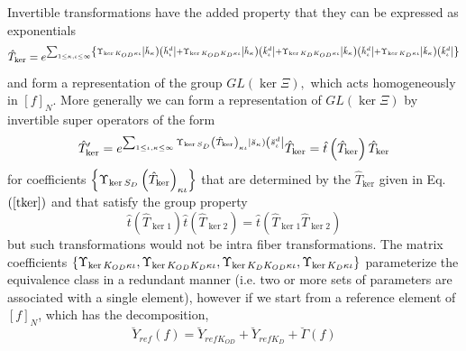 Invertible transformations have the added property that they can be
expressed as exponentials 
\begin{equation}
\hat{T}_{\ker }=e^{\sum_{1\leq \kappa ,\iota \leq \infty }\left\{ {\rm %
\Upsilon }_{\ker K_{OD}\kappa \iota }\left| \breve{h}_{\kappa }\right)
\left( \breve{h}_{\iota }^{d}\right| +{\rm \Upsilon }_{\ker
K_{OD}K_{D}\kappa \iota }\left| \breve{h}_{\kappa }\right) \left( \breve{k}%
_{\iota }^{d}\right| +{\rm \Upsilon }_{\ker K_{D}K_{OD}\kappa \iota }\left| 
\breve{k}_{\kappa }\right) \left( \breve{h}_{\iota }^{d}\right| +{\rm %
\Upsilon }_{\ker K_{D}\kappa \iota }\left| \breve{k}_{\kappa }\right) \left( 
\breve{k}_{\iota }^{d}\right| \right\} }  \label{tker}
\end{equation}%
and form a representation of the group $GL\left( \ker \Xi \right) ,$ which
acts homogeneously\cite{homogen} in $\left[ f\right] _{N}$. More generally
we can form a representation of $GL\left( \ker \Xi \right) $ by invertible
super operators of the form 
\begin{equation}
\hat{T}_{\ker }^{\prime }=e^{\sum_{1\leq \iota ,\kappa \leq \infty }{\rm %
\Upsilon }_{\ker S_{D}}\left( \hat{T}_{\ker }\right) _{\kappa \iota }\left| 
\breve{s}_{\kappa }\right) \left( \breve{s}_{\iota }^{d}\right| }\hat{T}%
_{\ker }=\hat{t}\left( \hat{T}_{\ker }\right) \hat{T}_{\ker }
\end{equation}%
for coefficients $\left\{ {\rm \Upsilon }_{\ker S_{D}}\left( \hat{T}_{\ker
}\right) _{\kappa \iota }\right\} $ that are determined by the $\hat{T}%
_{\ker }$ given in Eq.$\left( \ref{tker}\right) $ and that satisfy the group
property%
\begin{equation}
\hat{t}\left( \hat{T}_{\ker 1}\right) \hat{t}\left( \hat{T}_{\ker 2}\right) =%
\hat{t}\left( \hat{T}_{\ker 1}\hat{T}_{\ker 2}\right)
\end{equation}%
but such transformations would not be intra fiber transformations. The
matrix coefficients $\left\{ {\rm \Upsilon }_{\ker K_{OD}\kappa \iota },{\rm %
\Upsilon }_{\ker K_{OD}K_{D}\kappa \iota },{\rm \Upsilon }_{\ker
K_{D}K_{OD}\kappa \iota },{\rm \Upsilon }_{\ker K_{D}\kappa \iota }\right\} $
parameterize the equivalence class in a redundant manner (i.e. two or more
sets of parameters are associated with a single element), however if we
start from a reference element of $\left[ f\right] _{N}$, which has the
decomposition, 
\begin{equation}
\breve{Y}_{ref}\left( f\right) =\breve{Y}_{refK_{OD}}+\breve{Y}_{refK_{D}}+%
\breve{\Gamma}\left( f\right)
\end{equation}%
